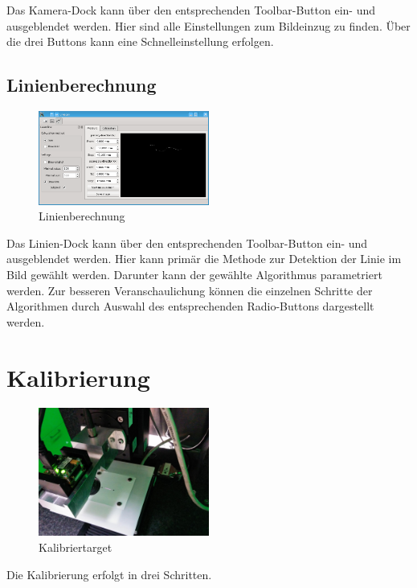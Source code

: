 \documentclass[a4paper,10pt]{scrartcl}
\begin{document}
Das Kamera-Dock kann über den entsprechenden Toolbar-Button ein- und ausgeblendet werden.
Hier sind alle Einstellungen zum Bildeinzug zu finden. Über die drei Buttons kann eine
Schnelleinstellung erfolgen.

\subsection{Linienberechnung}

\begin{figure}[H]
  \centering
  \includegraphics[width=0.5\textwidth]{include/laser.png}
  \caption{Linienberechnung}
  \label{fig:overview}
\end{figure}

Das Linien-Dock kann über den entsprechenden Toolbar-Button ein- und ausgeblendet werden.
Hier kann primär die Methode zur Detektion der Linie im Bild gewählt werden. Darunter kann
der gewählte Algorithmus parametriert werden. Zur besseren Veranschaulichung können die einzelnen
Schritte der Algorithmen durch Auswahl des entsprechenden Radio-Buttons dargestellt werden.

\section{Kalibrierung}

\begin{figure}[H]
  \centering
  \includegraphics[width=0.5\textwidth]{include/IMG_20160412_162021.jpg}
  \caption{Kalibriertarget}
  \label{fig:overview}
\end{figure}

Die Kalibrierung erfolgt in drei Schritten.
\end{document}
